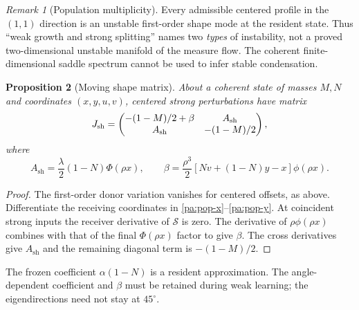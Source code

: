 \documentclass[11pt]{article}
\numberwithin{equation}{section}
\newtheorem{proposition}{Proposition}[section]
\theoremstyle{definition}
\theoremstyle{remark}
\newtheorem{remark}[proposition]{Remark}
\newcommand{\1}{\mathbf 1}
\begin{document}
\begin{remark}[Population multiplicity]
Every admissible centered profile in the $(1,1)$ direction is an unstable
first-order shape mode at the resident state. Thus ``weak growth and strong
splitting'' names two \emph{types} of instability, not a proved two-dimensional
unstable manifold of the measure flow. The coherent finite-dimensional
saddle spectrum cannot be used to infer stable condensation.
\end{remark}

\begin{proposition}[Moving shape matrix]\label{pa:moving-shape}
About a coherent state of masses $M,N$ and coordinates $(x,y,u,v)$, centered
strong perturbations have matrix
\begin{equation}\label{pa:Jmoving}
 J_{\rm sh}=
 \begin{pmatrix}-(1-M)/2+\beta&A_\mathrm{sh}\\
 A_\mathrm{sh}&-(1-M)/2\end{pmatrix},
\end{equation}
where
\[
 A_\mathrm{sh}=\frac\lambda2(1-N)\Phi(\rho x),\qquad
 \beta=\frac{\rho^3}{2}[Nv+(1-N)y-x]\phi(\rho x).
\]
\end{proposition}
\begin{proof}
The first-order donor variation vanishes for centered offsets, as above.
Differentiate the receiving coordinates in \eqref{pa:pop-x}--\eqref{pa:pop-y}.
At coincident strong inputs the receiver derivative of $\mathcal S$ is zero.
The derivative of $\rho\phi(\rho x)$ combines with that of the final
$\Phi(\rho x)$ factor to give $\beta$. The cross derivatives give
$A_\mathrm{sh}$ and the remaining diagonal term is $-(1-M)/2$.
\end{proof}
The frozen coefficient $\alpha(1-N)$ is a resident approximation.
The angle-dependent coefficient and $\beta$ must be retained during
weak learning; the eigendirections need not stay at $45^\circ$.
\end{document}
